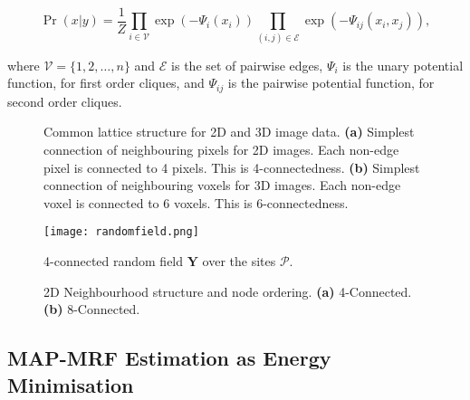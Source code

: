 \begin{equation}
\Pr(x|y) = \frac{1}{Z}\prod_{i \in \mathcal{V}}\exp(-\Psi_i(x_i))\prod_{(i,j) \in \mathcal{E}}\exp(-\Psi_{ij}(x_i,x_j)),
\label{eq:gibbs2}
\end{equation}

where $\mathcal{V} = \{1,2,\ldots,n\}$ and $\mathcal{E}$ is the set of pairwise edges, $\Psi_i$ is the unary potential function, for first order cliques, and $\Psi_{ij}$ is the pairwise potential function, for second order cliques.

\begin{figure}[!t]
	\centering
	\caption{Common lattice structure for 2D and 3D image data. 
	\textbf{(a)} Simplest connection of neighbouring pixels for 2D images. Each non-edge pixel is connected to 4 pixels. This is 4-connectedness.
	\textbf{(b)} Simplest connection of neighbouring voxels for 3D images. Each non-edge voxel is connected to 6 voxels. This is 6-connectedness.}
	\label{fig:connectedness}
\end{figure}

\begin{figure}[!t]
	\centering
	\texttt{[image: randomfield.png]}
	\caption{4-connected random field $\mathbf{Y}$ over the sites $\mathcal{P}$.}
	\label{fig:randomfield}
\end{figure}

\begin{figure}[!t]
	\centering
	\caption{2D Neighbourhood structure and node ordering. \textbf{(a)} 4-Connected. \textbf{(b)} 8-Connected.}
	\label{fig:cliques}
\end{figure}


\subsection{MAP-MRF Estimation as Energy Minimisation}
\label{sec:MAPMRFEstimation}

